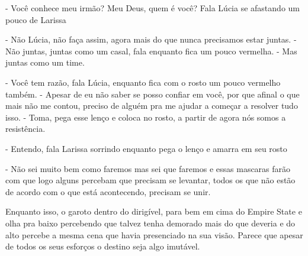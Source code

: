 - Você conhece meu irmão? Meu Deus, quem é você? Fala Lúcia se afastando um pouco de Larissa

- Não Lúcia, não faça assim, agora mais do que nunca precisamos estar juntas. - Não juntas, juntas como um casal, fala enquanto fica um pouco vermelha. - Mas juntas como um time.

- Você tem razão, fala Lúcia, enquanto fica com o rosto um pouco vermelho também. - Apesar de eu não saber se posso confiar em você, por que afinal o que mais não me contou, preciso de alguém pra me ajudar a começar a resolver tudo isso. - Toma, pega esse lenço e coloca no rosto, a partir de agora nós somos a resistência.

- Entendo, fala Larissa sorrindo enquanto pega o lenço e amarra em seu rosto

- Não sei muito bem como faremos mas sei que faremos e essas mascaras farão com que logo alguns percebam que precisam se levantar, todos os que não estão de acordo com o que está acontecendo, precisam se unir.

Enquanto isso, o garoto dentro do dirigível, para bem em cima do Empire State e olha pra baixo percebendo que talvez tenha demorado mais do que deveria e do alto percebe a mesma cena que havia presenciado na sua visão. Parece que apesar de todos os seus esforços o destino seja algo imutável.

